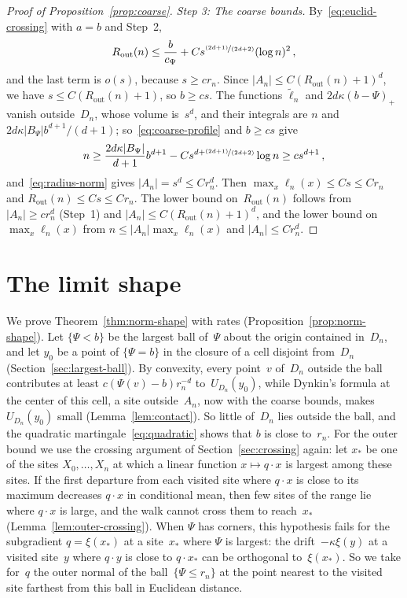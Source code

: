 \documentclass[11pt]{amsart}
\theoremstyle{plain}
\theoremstyle{definition}
\newcommand{\drift}{\kappa}
\newcommand{\gauge}{\Psi}
\newcommand{\nf}{\nicefrac}
\newcommand{\Rout}{R_{\mathrm{out}}}
\numberwithin{equation}{section}
\begin{document}
\begin{proof}[Proof of Proposition~\ref{prop:coarse}]
\emph{Step 3: The coarse bounds.} By~\eqref{eq:euclid-crossing} with $a=b$ and Step~2,
\begin{equation*}
\Rout(n)\leq\frac b{c_\gauge}+Cs^{\nf{(2d+1)}{(2d+2)}}(\log n)^2\, ,
\end{equation*}
and the last term is $o(s)$, because $s\geq cr_n$. Since $|A_n|\leq C(\Rout(n)+1)^d$, we have $s\leq C(\Rout(n)+1)$, so $b\geq cs$. The functions $\widetilde\ell_n$ and $2d\drift(b-\gauge)_+$ vanish outside~$D_n$, whose volume is~$s^d$, and their integrals are $n$ and $2d\drift|B_\gauge|b^{d+1}/(d+1)$; so~\eqref{eq:coarse-profile} and $b\geq cs$ give
\begin{equation*}
n\geq\frac{2d\drift|B_\gauge|}{d+1}b^{d+1}-Cs^{d+\nf{(2d+1)}{(2d+2)}}\log n\geq cs^{d+1}\, ,
\end{equation*}
and~\eqref{eq:radius-norm} gives $|A_n|=s^d\leq Cr_n^d$. Then $\max_x\ell_n(x)\leq Cs\leq Cr_n$ and $\Rout(n)\leq Cs\leq Cr_n$. The lower bound on~$\Rout(n)$ follows from $|A_n|\geq cr_n^d$ (Step~1) and $|A_n|\leq C(\Rout(n)+1)^d$, and the lower bound on $\max_x\ell_n(x)$ from $n\leq|A_n|\max_x\ell_n(x)$ and $|A_n|\leq Cr_n^d$.
\end{proof}

\section{The limit shape}\label{sec:norms}

We prove Theorem~\ref{thm:norm-shape} with rates (Proposition~\ref{prop:norm-shape}). Let $\{\gauge<b\}$ be the largest ball of~$\gauge$ about the origin contained in~$D_n$, and let $y_0$ be a point of $\{\gauge=b\}$ in the closure of a cell disjoint from~$D_n$ (Section~\ref{sec:largest-ball}). By convexity, every point~$v$ of~$D_n$ outside the ball contributes at least $c(\gauge(v)-b)r_n^{-d}$ to~$U_{D_n}(y_0)$, while Dynkin's formula at the center of this cell, a site outside~$A_n$, now with the coarse bounds, makes $U_{D_n}(y_0)$ small (Lemma~\ref{lem:contact}). So little of~$D_n$ lies outside the ball, and the quadratic martingale~\eqref{eq:quadratic} shows that $b$ is close to~$r_n$. For the outer bound we use the crossing argument of Section~\ref{sec:crossing} again: let $x_*$ be one of the sites $X_0,\ldots,X_n$ at which a linear function $x\mapsto q\cdot x$ is largest among these sites. If the first departure from each visited site where $q\cdot x$ is close to its maximum decreases $q\cdot x$ in conditional mean, then few sites of the range lie where $q\cdot x$ is large, and the walk cannot cross them to reach~$x_*$ (Lemma~\ref{lem:outer-crossing}). When $\gauge$ has corners, this hypothesis fails for the subgradient $q=\xi(x_*)$ at a site~$x_*$ where $\gauge$ is largest: the drift~$-\drift\xi(y)$ at a visited site~$y$ where $q\cdot y$ is close to $q\cdot x_*$ can be orthogonal to~$\xi(x_*)$. So we take for~$q$ the outer normal of the ball~$\{\gauge\leq r_n\}$ at the point nearest to the visited site farthest from this ball in Euclidean distance.
\end{document}

